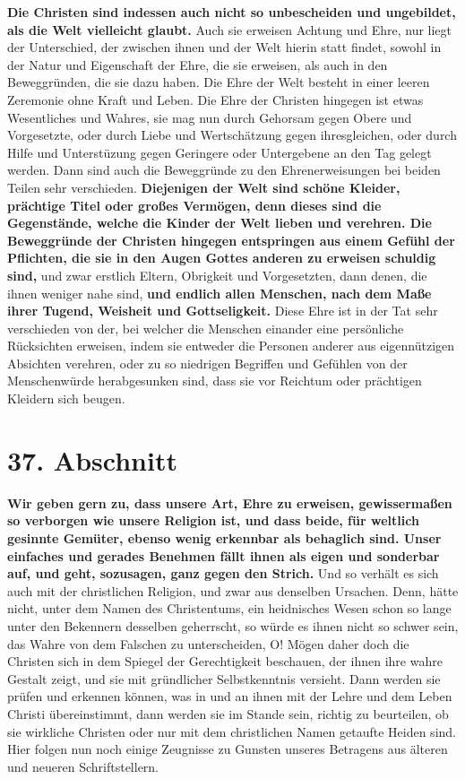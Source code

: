 \textbf{Die Christen sind indessen auch nicht so unbescheiden und ungebildet,
als die
Welt vielleicht glaubt.} Auch sie erweisen Achtung und Ehre, nur liegt der
Unterschied, der zwischen ihnen und der Welt hierin statt findet, sowohl in der
Natur und Eigenschaft der Ehre, die sie erweisen, als auch in den Beweggründen,
die sie dazu haben. Die Ehre der Welt besteht in einer leeren Zeremonie ohne
Kraft und Leben. Die Ehre der Christen hingegen ist etwas Wesentliches und
Wahres, sie mag nun durch Gehorsam gegen Obere und Vorgesetzte, oder durch Liebe
und Wertschätzung gegen ihresgleichen, oder durch Hilfe und Unterstüzung gegen
Geringere oder Untergebene an den Tag gelegt werden. Dann sind auch die
Beweggründe zu den Ehrenerweisungen bei beiden Teilen sehr verschieden.
\label{ref:09_36_ehre_erweisen} \textbf{Diejenigen der Welt sind schöne
Kleider, prächtige Titel oder großes
Vermögen, denn dieses sind die Gegenstände, welche die Kinder der Welt
 lieben und
verehren. Die Beweggründe der Christen hingegen entspringen aus einem Gefühl
der Pflichten, die sie in den Augen Gottes anderen zu erweisen schuldig sind,}
und
zwar erstlich Eltern, Obrigkeit und Vorgesetzten, dann denen, die ihnen
weniger nahe sind, \textbf{und endlich allen Menschen, nach dem Maße ihrer
Tugend,
Weisheit und Gottseligkeit.} Diese
Ehre ist in der Tat sehr verschieden von der,
bei welcher die Menschen einander eine persönliche Rücksichten erweisen, indem
sie
entweder die Personen anderer aus eigennützigen Absichten verehren, oder zu so
niedrigen Begriffen und Gefühlen von der Menschenwürde herabgesunken sind, dass
sie
vor Reichtum oder prächtigen Kleidern sich beugen.

\section{37. Abschnitt} \label{kap9_ab37}

\label{ref:09_37_ehre_erweisen} \textbf{Wir geben gern zu, dass unsere Art,
Ehre zu erweisen, gewissermaßen so verborgen
wie unsere Religion ist, und dass beide, für weltlich
gesinnte
Gemüter, ebenso
wenig erkennbar als behaglich sind. Unser einfaches und gerades Benehmen fällt
ihnen als eigen und sonderbar auf, und geht, sozusagen, ganz gegen den Strich.}
Und so verhält es sich auch mit der christlichen Religion, und zwar aus
denselben Ursachen. Denn, hätte nicht, unter dem Namen des Christentums, ein
heidnisches Wesen schon so lange unter den Bekennern desselben geherrscht, so
würde es ihnen nicht so schwer sein, das Wahre von dem Falschen zu
unterscheiden, O! Mögen daher doch die Christen sich in dem Spiegel der
Gerechtigkeit beschauen, der ihnen ihre wahre
Gestalt
 zeigt, und sie mit
gründlicher Selbstkenntnis versieht. Dann werden sie prüfen und erkennen
können, was in und an ihnen mit der Lehre und dem Leben Christi übereinstimmt,
dann werden sie im Stande sein, richtig zu beurteilen, ob sie wirkliche
Christen oder nur mit dem christlichen Namen getaufte
Heiden sind. Hier
folgen nun noch einige Zeugnisse zu Gunsten unseres Betragens aus älteren und
neueren Schriftstellern.

